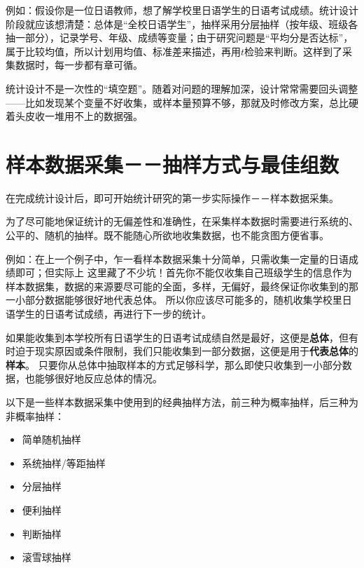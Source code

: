 \documentclass[lang=cn,10pt]{elegantbook}
\begin{document}
例如：假设你是一位日语教师，想了解学校里日语学生的日语考试成绩。统计设计阶段就应该想清楚：总体是“全校日语学生”，抽样采用分层抽样（按年级、班级各抽一部分），记录学号、年级、成绩等变量；由于研究问题是“平均分是否达标”，属于比较均值，所以计划用均值、标准差来描述，再用$t$检验来判断。这样到了采集数据时，每一步都有章可循。

\begin{remark}
统计设计不是一次性的“填空题”。随着对问题的理解加深，设计常常需要回头调整——比如发现某个变量不好收集，或样本量预算不够，那就及时修改方案，总比硬着头皮收一堆用不上的数据强。
\end{remark}





\section{样本数据采集－－抽样方式与最佳组数}
在完成统计设计后，即可开始统计研究的第一步实际操作－－样本数据采集。

为了尽可能地保证统计的无偏差性和准确性，在采集样本数据时需要进行系统的、公平的、随机的抽样。既不能随心所欲地收集数据，也不能贪图方便省事。

例如：在上一个例子中，乍一看样本数据采集十分简单，只需收集一定量的日语成绩即可；但实际上
这里藏了不少坑！首先你不能仅收集自己班级学生的信息作为样本数据集，数据的来源要尽可能的全面，多样，无偏好，最终保证你收集到的那一小部分数据能够很好地代表总体。
所以你应该尽可能多的，随机收集学校里日语学生的日语考试成绩，再进行下一步的统计。

\begin{remark}
如果能收集到本学校所有日语学生的日语考试成绩自然是最好，这便是\textbf{总体}，但有时迫于现实原因或条件限制，我们只能收集到一部分数据，这便是用于\textbf{代表总体}的\textbf{样本}。
只要你从总体中抽取样本的方式足够科学，那么即使只收集到一小部分数据，也能够很好地反应总体的情况。
\end{remark}

以下是一些样本数据采集中使用到的经典抽样方法，前三种为概率抽样，后三种为非概率抽样：
\begin{itemize}
  \item 简单随机抽样
  \item 系统抽样/等距抽样
  \item 分层抽样
  \item 便利抽样
  \item 判断抽样
  \item 滚雪球抽样
\end{itemize}
\end{document}
